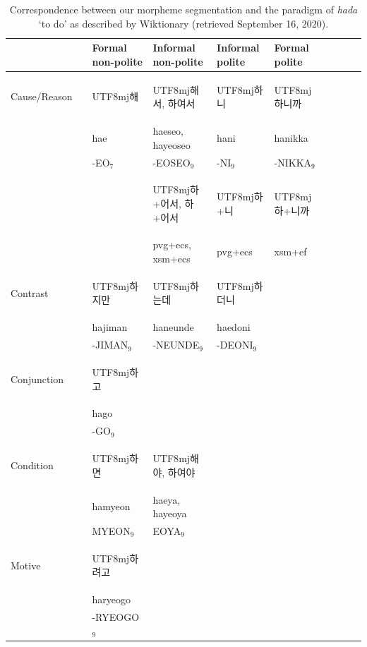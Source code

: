 \documentclass[11pt,letterpaper]{article}
\newcommand{\korean}[1]{\begin{CJK}{UTF8}{mj}#1\end{CJK}}
\begin{document}
\begin{table}
\begin{tabular}{llllllllll}
           &          &Formal non-polite & Informal non-polite & Informal polite & Formal polite \\ \hline \hline
Cause/Reason && \korean{해} & \korean{해서, 하여서} & \korean{하니} & \korean{하니까} \\
&& hae & haeseo, hayeoseo & hani & hanikka \\ 
&& -EO$_7$ & -EOSEO$_9$ & -NI$_9$ & -NIKKA$_9$ \\
&& &\korean{하+어서, 하+어서} & \korean{하+니} & \korean{하+니까} \\
&& & pvg+ecs, xsm+ecs         & pvg+ecs & xsm+ef \\
\hline
Contrast && \korean{하지만} & \korean{하는데} & \korean{하더니} \\
 && hajiman & haneunde & haedoni & \\ 
 && -JIMAN$_9$ & -NEUNDE$_9$ & -DEONI$_9$ & \\ \hline
Conjunction && \korean{하고} \\
 && hago \\ 
&& -GO$_9$ \\ \hline
Condition && \korean{하면} & \korean{해야, 하여야} \\
&& hamyeon & haeya, hayeoya \\
&& MYEON$_9$ & EOYA$_9$ \\ \hline
Motive && \korean{하려고} \\
 && haryeogo \\
&& -RYEOGO$_9$
\end{tabular}
	\caption{Correspondence between our morpheme segmentation and the paradigm of \textit{hada} `to do' as described by Wiktionary (retrieved September 16, 2020).}\label{tab:korean-hada}
\end{table}


\end{document}

